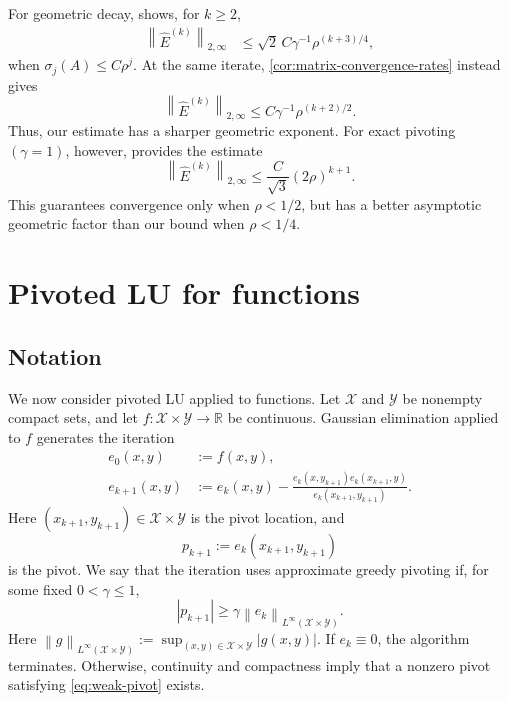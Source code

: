 \documentclass[11pt]{article}
\theoremstyle{definition}
\theoremstyle{remark}
\newcommand{\R}{\mathbb{R}}
\newcommand{\norm}[1]{\left\lVert #1\right\rVert}
\newcommand{\abs}[1]{\left\lvert #1\right\rvert}
\begin{document}
For geometric decay,
\cite[Corollary~3.3(i)]{DeVorePetrovaWojtaszczyk2013} shows, for $k\ge2$,
\[
\begin{aligned}
    \norm{\widehat E^{(k)}}_{2,\infty}
    &\le
    \sqrt2\,C\gamma^{-1}\rho^{(k+3)/4},
\end{aligned}
\]
when $\sigma_j(A)\le C\rho^j$. At the same iterate,
\cref{cor:matrix-convergence-rates} instead gives
\[
    \norm{\widehat E^{(k)}}_{2,\infty}
    \le
    C\gamma^{-1}\rho^{(k+2)/2}.
\]
Thus, our estimate has a sharper geometric exponent.
For exact pivoting $(\gamma=1)$, however,
\cite[Theorem~4.4]{BinevEtAl2011} provides the estimate
\[
    \norm{\widehat E^{(k)}}_{2,\infty}
    \le
    \frac{C}{\sqrt3}(2\rho)^{k+1}.
\]
This guarantees convergence only when $\rho<1/2$, but has a better asymptotic
geometric factor than our bound when $\rho<1/4$.

\section{Pivoted LU for functions}
\label{sec:function-case}

\subsection{Notation}
We now consider pivoted LU applied to functions.
Let $\mathcal X$ and $\mathcal Y$ be nonempty compact sets, and let
$f:\mathcal X\times\mathcal Y\to\R$ be continuous.
Gaussian elimination applied to $f$ generates the
iteration
\begin{equation*}
\begin{aligned}
    e_0(x,y)&:=f(x,y),\\
    e_{k+1}(x,y)
    &:=
    e_k(x,y)
    -
    \frac{
      e_k(x,y_{k+1})e_k(x_{k+1},y)
    }{
      e_k(x_{k+1},y_{k+1})
    }.
\end{aligned}
\end{equation*}
Here $(x_{k+1},y_{k+1})\in\mathcal X\times\mathcal Y$ is the pivot
location, and
\[
    p_{k+1}:=e_k(x_{k+1},y_{k+1})
\]
is the pivot. We say that the iteration uses approximate greedy pivoting
if, for some fixed $0<\gamma\le1$,
\begin{equation}
    \abs{p_{k+1}}
    \ge
    \gamma
    \norm{e_k}_{L^\infty(\mathcal X\times\mathcal Y)}.
    \label{eq:weak-pivot}
\end{equation}
Here
$\norm{g}_{L^\infty(\mathcal X\times\mathcal Y)}
:=
\sup_{(x,y)\in\mathcal X\times\mathcal Y}\abs{g(x,y)}$.
If $e_k\equiv0$, the algorithm terminates. Otherwise, continuity and
compactness imply that a
nonzero pivot satisfying \eqref{eq:weak-pivot} exists.
\end{document}
